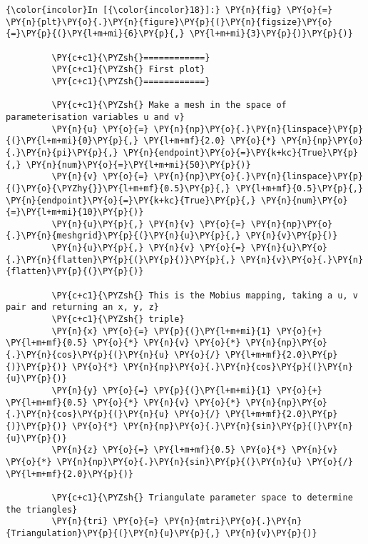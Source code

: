     \begin{Verbatim}[commandchars=\\\{\}]
{\color{incolor}In [{\color{incolor}18}]:} \PY{n}{fig} \PY{o}{=} \PY{n}{plt}\PY{o}{.}\PY{n}{figure}\PY{p}{(}\PY{n}{figsize}\PY{o}{=}\PY{p}{(}\PY{l+m+mi}{6}\PY{p}{,} \PY{l+m+mi}{3}\PY{p}{)}\PY{p}{)}
         
         \PY{c+c1}{\PYZsh{}============}
         \PY{c+c1}{\PYZsh{} First plot}
         \PY{c+c1}{\PYZsh{}============}
         
         \PY{c+c1}{\PYZsh{} Make a mesh in the space of parameterisation variables u and v}
         \PY{n}{u} \PY{o}{=} \PY{n}{np}\PY{o}{.}\PY{n}{linspace}\PY{p}{(}\PY{l+m+mi}{0}\PY{p}{,} \PY{l+m+mf}{2.0} \PY{o}{*} \PY{n}{np}\PY{o}{.}\PY{n}{pi}\PY{p}{,} \PY{n}{endpoint}\PY{o}{=}\PY{k+kc}{True}\PY{p}{,} \PY{n}{num}\PY{o}{=}\PY{l+m+mi}{50}\PY{p}{)}
         \PY{n}{v} \PY{o}{=} \PY{n}{np}\PY{o}{.}\PY{n}{linspace}\PY{p}{(}\PY{o}{\PYZhy{}}\PY{l+m+mf}{0.5}\PY{p}{,} \PY{l+m+mf}{0.5}\PY{p}{,} \PY{n}{endpoint}\PY{o}{=}\PY{k+kc}{True}\PY{p}{,} \PY{n}{num}\PY{o}{=}\PY{l+m+mi}{10}\PY{p}{)}
         \PY{n}{u}\PY{p}{,} \PY{n}{v} \PY{o}{=} \PY{n}{np}\PY{o}{.}\PY{n}{meshgrid}\PY{p}{(}\PY{n}{u}\PY{p}{,} \PY{n}{v}\PY{p}{)}
         \PY{n}{u}\PY{p}{,} \PY{n}{v} \PY{o}{=} \PY{n}{u}\PY{o}{.}\PY{n}{flatten}\PY{p}{(}\PY{p}{)}\PY{p}{,} \PY{n}{v}\PY{o}{.}\PY{n}{flatten}\PY{p}{(}\PY{p}{)}
         
         \PY{c+c1}{\PYZsh{} This is the Mobius mapping, taking a u, v pair and returning an x, y, z}
         \PY{c+c1}{\PYZsh{} triple}
         \PY{n}{x} \PY{o}{=} \PY{p}{(}\PY{l+m+mi}{1} \PY{o}{+} \PY{l+m+mf}{0.5} \PY{o}{*} \PY{n}{v} \PY{o}{*} \PY{n}{np}\PY{o}{.}\PY{n}{cos}\PY{p}{(}\PY{n}{u} \PY{o}{/} \PY{l+m+mf}{2.0}\PY{p}{)}\PY{p}{)} \PY{o}{*} \PY{n}{np}\PY{o}{.}\PY{n}{cos}\PY{p}{(}\PY{n}{u}\PY{p}{)}
         \PY{n}{y} \PY{o}{=} \PY{p}{(}\PY{l+m+mi}{1} \PY{o}{+} \PY{l+m+mf}{0.5} \PY{o}{*} \PY{n}{v} \PY{o}{*} \PY{n}{np}\PY{o}{.}\PY{n}{cos}\PY{p}{(}\PY{n}{u} \PY{o}{/} \PY{l+m+mf}{2.0}\PY{p}{)}\PY{p}{)} \PY{o}{*} \PY{n}{np}\PY{o}{.}\PY{n}{sin}\PY{p}{(}\PY{n}{u}\PY{p}{)}
         \PY{n}{z} \PY{o}{=} \PY{l+m+mf}{0.5} \PY{o}{*} \PY{n}{v} \PY{o}{*} \PY{n}{np}\PY{o}{.}\PY{n}{sin}\PY{p}{(}\PY{n}{u} \PY{o}{/} \PY{l+m+mf}{2.0}\PY{p}{)}
         
         \PY{c+c1}{\PYZsh{} Triangulate parameter space to determine the triangles}
         \PY{n}{tri} \PY{o}{=} \PY{n}{mtri}\PY{o}{.}\PY{n}{Triangulation}\PY{p}{(}\PY{n}{u}\PY{p}{,} \PY{n}{v}\PY{p}{)}
         

\end{Verbatim}
